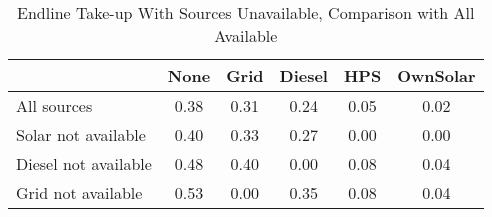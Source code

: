 \begin{table}[htbp]\centering
\caption{Endline Take-up With Sources Unavailable, Comparison with All Available\label {tab1}}
\begin{tabular}{l*{5}{c}}
\toprule
            &        None&        Grid&      Diesel&         HPS&    OwnSolar\\
\midrule
All sources &        0.38&        0.31&        0.24&        0.05&        0.02\\
Solar not available&        0.40&        0.33&        0.27&        0.00&        0.00\\
Diesel not available&        0.48&        0.40&        0.00&        0.08&        0.04\\
Grid not available&        0.53&        0.00&        0.35&        0.08&        0.04\\
\bottomrule
\end{tabular}
\end{table}
